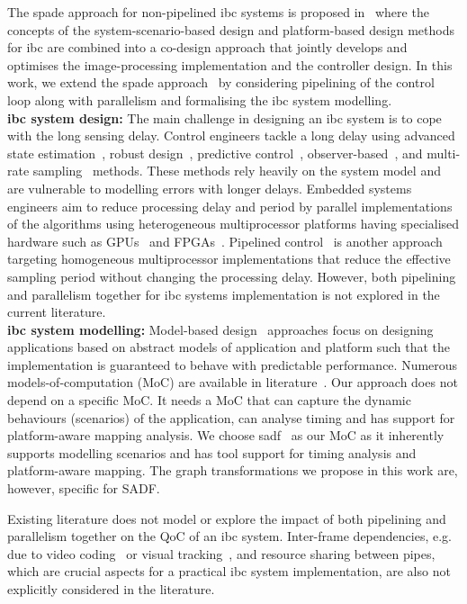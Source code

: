 The \gls{spade} approach for non-pipelined \gls{ibc} systems is proposed in~\cite{mohamed2019designing,mohamed2020scenario} where the concepts of the system-scenario-based design and platform-based design methods for \gls{ibc} are combined into a co-design approach that jointly develops and optimises the image-processing implementation and the controller design.
In this work, we extend the \gls{spade} approach~\cite{mohamed2020scenario} by considering pipelining of the control loop along with parallelism and formalising the \gls{ibc} system modelling.
\\[1ex]
\noindent\textbf{\gls{ibc} system design:}
The main challenge in designing an \gls{ibc} system is to cope with the long sensing delay.
Control engineers tackle a long delay using advanced state estimation~\cite{wang2014multirate}, robust design~\cite{kawamura2012robust}, predictive control~\cite{macesanu2014time}, observer-based~\cite{van2018data}, and multi-rate
sampling~\cite{fujimoto2003visual} methods. 
These methods rely heavily on the system model and are vulnerable to modelling errors with longer delays.
Embedded systems engineers aim to reduce processing delay and period by parallel implementations of the algorithms using heterogeneous multiprocessor platforms having specialised hardware such as GPUs~\cite{agrawal2014gpu,mohamed2020scenario} and FPGAs~\cite{kestur2012emulating}. 
Pipelined control~\cite{krautgartner1998performance,medina2019designing} is another approach targeting homogeneous multiprocessor implementations that reduce the effective sampling period without changing the processing delay.
However, both pipelining and parallelism together for \gls{ibc} systems implementation is not explored in the current literature. 
\\[1ex]
\noindent\textbf{\gls{ibc} system modelling:} Model-based design~\cite{lee1998framework,thiele2000real} approaches focus on designing applications based on abstract models of application and platform such that the implementation is guaranteed to behave with predictable performance. 
Numerous models-of-computation (MoC) are available in literature~\cite{theelen2006scenario,stuijk2010predictable, ChakrabortyKT03, DavisBBL07}. 
Our approach does not depend on a specific MoC.
It needs a MoC that can capture the dynamic behaviours (scenarios) of the application, can analyse timing and has support for platform-aware mapping analysis. We choose \gls{sadf}~\cite{theelen2006scenario} as our MoC as it inherently supports modelling scenarios and has tool support for timing analysis and platform-aware mapping.
The graph transformations we propose in this work are, however, specific for SADF.

Existing literature does not model or explore the impact of both pipelining and parallelism together on the QoC of an \gls{ibc} system.
Inter-frame dependencies, e.g. due to video coding~\cite{li2015lagrangian} or visual tracking~\cite{smeulders2013visual}, and resource sharing between pipes, which are crucial aspects for a practical \gls{ibc} system implementation, are also not explicitly considered in the literature.